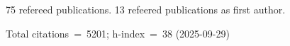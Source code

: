 75 refereed publications. 13 refeered publications as first author.

Total citations~=~5201; h-index~=~38 (2025-09-29)